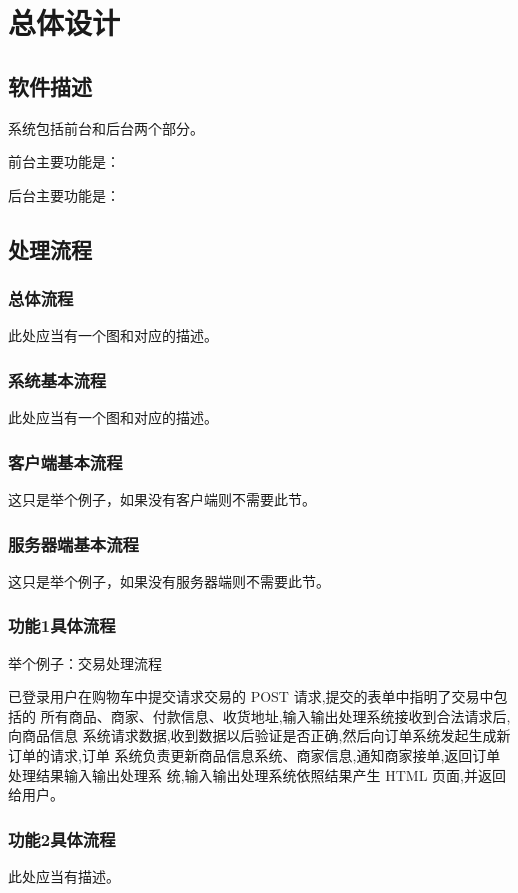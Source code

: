 \chapter{总体设计}
\section{软件描述}
系统包括前台和后台两个部分。

前台主要功能是：

后台主要功能是：

\section{处理流程}
\subsection{总体流程}
此处应当有一个图和对应的描述。

\subsection{系统基本流程}
此处应当有一个图和对应的描述。

\subsection{客户端基本流程}
这只是举个例子，如果没有客户端则不需要此节。

\subsection{服务器端基本流程}
这只是举个例子，如果没有服务器端则不需要此节。

\subsection{功能1具体流程}
举个例子：交易处理流程

已登录用户在购物车中提交请求交易的 POST 请求,提交的表单中指明了交易中包括的
所有商品、商家、付款信息、收货地址,输入输出处理系统接收到合法请求后,向商品信息
系统请求数据,收到数据以后验证是否正确,然后向订单系统发起生成新订单的请求,订单
系统负责更新商品信息系统、商家信息,通知商家接单,返回订单处理结果输入输出处理系
统,输入输出处理系统依照结果产生 HTML 页面,并返回给用户。

\subsection{功能2具体流程}
此处应当有描述。

